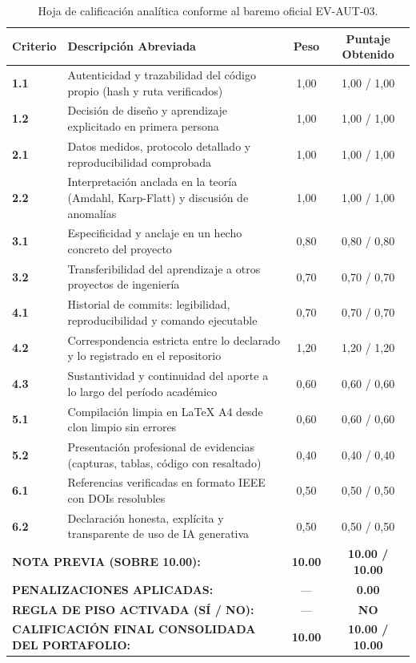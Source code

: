 \documentclass[11pt,a4paper]{article}
\begin{document}
\begin{table}[H]
    \centering
    \small
    \caption{Hoja de calificación analítica conforme al baremo oficial EV-AUT-03.}
    \label{tab:hoja_calificacion_rubrica}
    \renewcommand{\arraystretch}{1.2}
    \begin{tabularx}{\textwidth}{p{1.2cm}Xcc}
        \toprule
        \textbf{Criterio} & \textbf{Descripción Abreviada} & \textbf{Peso} & \textbf{Puntaje Obtenido} \\
        \midrule
        \textbf{1.1} & Autenticidad y trazabilidad del código propio (hash y ruta verificados) & 1,00 & 1,00 / 1,00 \\
        \textbf{1.2} & Decisión de diseño y aprendizaje explicitado en primera persona & 1,00 & 1,00 / 1,00 \\
        \textbf{2.1} & Datos medidos, protocolo detallado y reproducibilidad comprobada & 1,00 & 1,00 / 1,00 \\
        \textbf{2.2} & Interpretación anclada en la teoría (Amdahl, Karp-Flatt) y discusión de anomalías & 1,00 & 1,00 / 1,00 \\
        \textbf{3.1} & Especificidad y anclaje en un hecho concreto del proyecto & 0,80 & 0,80 / 0,80 \\
        \textbf{3.2} & Transferibilidad del aprendizaje a otros proyectos de ingeniería & 0,70 & 0,70 / 0,70 \\
        \textbf{4.1} & Historial de commits: legibilidad, reproducibilidad y comando ejecutable & 0,70 & 0,70 / 0,70 \\
        \textbf{4.2} & Correspondencia estricta entre lo declarado y lo registrado en el repositorio & 1,20 & 1,20 / 1,20 \\
        \textbf{4.3} & Sustantividad y continuidad del aporte a lo largo del período académico & 0,60 & 0,60 / 0,60 \\
        \textbf{5.1} & Compilación limpia en LaTeX A4 desde clon limpio sin errores & 0,60 & 0,60 / 0,60 \\
        \textbf{5.2} & Presentación profesional de evidencias (capturas, tablas, código con resaltado) & 0,40 & 0,40 / 0,40 \\
        \textbf{6.1} & Referencias verificadas en formato IEEE con DOIs resolubles & 0,50 & 0,50 / 0,50 \\
        \textbf{6.2} & Declaración honesta, explícita y transparente de uso de IA generativa & 0,50 & 0,50 / 0,50 \\
        \midrule
        \multicolumn{2}{l}{\textbf{NOTA PREVIA (SOBRE 10.00):}} & \textbf{10.00} & \textbf{10.00 / 10.00} \\
        \multicolumn{2}{l}{\textbf{PENALIZACIONES APLICADAS:}} & --- & \textbf{0.00} \\
        \multicolumn{2}{l}{\textbf{REGLA DE PISO ACTIVADA (SÍ / NO):}} & --- & \textbf{NO} \\
        \midrule
        \multicolumn{2}{l}{\textbf{CALIFICACIÓN FINAL CONSOLIDADA DEL PORTAFOLIO:}} & \textbf{10.00} & \textbf{\Large 10.00 / 10.00} \\
        \bottomrule
    \end{tabularx}
\end{table}
\end{document}
